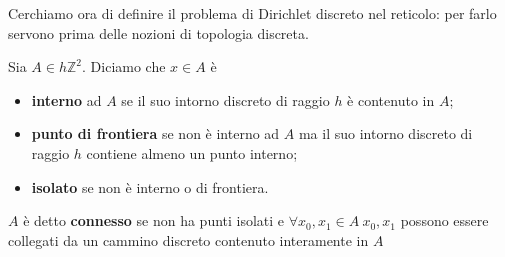 \documentclass[10pt,a4paper,twoside,openright]{book}
\begin{document}
Cerchiamo ora di definire il problema di Dirichlet discreto nel reticolo: per farlo servono prima delle nozioni di topologia discreta.

Sia $\displaystyle A\in h\mathbb{Z}^{2}$. Diciamo che $\displaystyle x\in A$ è
\begin{itemize}
	\item \textbf{interno} ad $\displaystyle A$ se il suo intorno discreto di raggio $\displaystyle h$ è contenuto in $\displaystyle A$;
	\item \textbf{punto di frontiera} se non è interno ad $\displaystyle A$ ma il suo intorno discreto di raggio $\displaystyle h$ contiene almeno un punto interno;
	\item \textbf{isolato} se non è interno o di frontiera.
\end{itemize}

$\displaystyle A$ è detto \textbf{connesso} se non ha punti isolati e $\displaystyle \forall x_{0},x_{1} \in A\ x_{0},x_{1}$ possono essere collegati da un cammino discreto contenuto interamente in $\displaystyle A$

\end{document}

